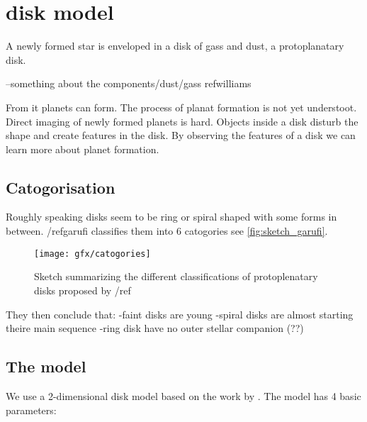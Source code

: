 




\section{disk model}

A newly formed star is enveloped in a disk of gass and dust, a protoplanatary disk.

--something about the components/dust/gass ref{williams}

From it planets can form. The process of planat formation is not yet understoot. Direct imaging of newly formed planets is hard. Objects inside a disk disturb the shape and create features in the disk. By observing the features of a disk we can learn more about planet formation.








\subsection{Catogorisation}

Roughly speaking disks seem to be ring or spiral shaped with some forms in between. /ref{garufi} classifies them into 6 catogories see \autoref{fig:sketch_garufi}. 

\begin{figure}[h]
    \label{sketch_garufi}
    \caption{Sketch summarizing the different classifications of protoplenatary disks proposed by /ref}
    \centering
    \texttt{[image: gfx/catogories]}
\end{figure}

They then conclude that: 
-faint disks are young
-spiral disks are almost starting theire main sequence
-ring disk have no outer stellar companion (??)  


\subsection{The model}

We use a 2-dimensional disk model based on the work by \cite{Pieter_Okko}. The model has 4 basic parameters: 

